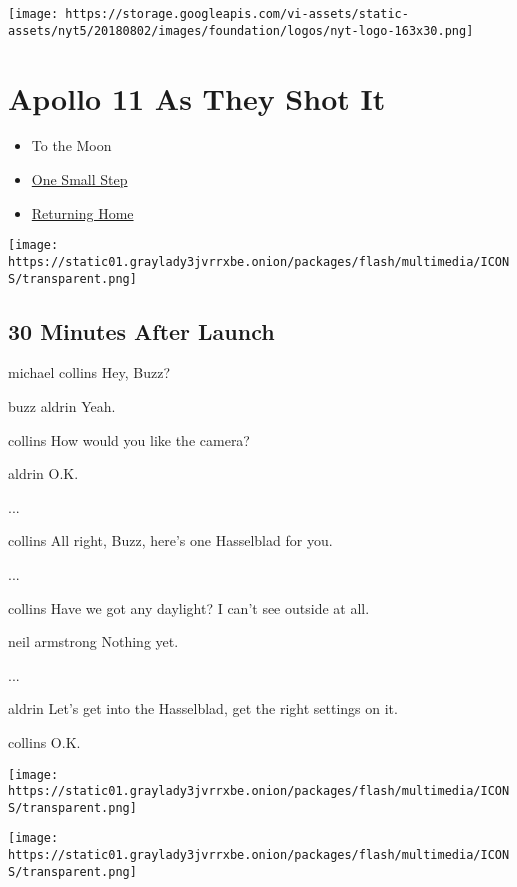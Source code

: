 \texttt{[image: https://storage.googleapis.com/vi-assets/static-assets/nyt5/20180802/images/foundation/logos/nyt-logo-163x30.png]}

\hypertarget{apollo-11-as-they-shot-it}{%
\section{\texorpdfstring{\textbf{Apollo 11} As They Shot
It}{Apollo 11 As They Shot It}}\label{apollo-11-as-they-shot-it}}

\begin{itemize}
\tightlist
\item
  To the Moon
\item
  \href{https://www.nytimes3xbfgragh.onion/interactive/2019/07/18/science/apollo-11-moon-landing-photos-ul.html}{One
  Small Step}
\item
  \href{https://www.nytimes3xbfgragh.onion/interactive/2019/07/18/science/apollo-11-moon-earth-photos-ul.html}{Returning
  Home}
\end{itemize}

\texttt{[image: https://static01.graylady3jvrrxbe.onion/packages/flash/multimedia/ICONS/transparent.png]}

\hypertarget{-30-minutes-after-launch-}{%
\subsection{ 30 Minutes After Launch }\label{-30-minutes-after-launch-}}

michael collins Hey, Buzz?

buzz aldrin Yeah.

collins How would you like the camera?

aldrin O.K.

...

collins All right, Buzz, here's one Hasselblad for you.

...

collins Have we got any daylight? I can't see outside at all.

neil armstrong Nothing yet.

...

aldrin Let's get into the Hasselblad, get the right settings on it.

collins O.K.

\texttt{[image: https://static01.graylady3jvrrxbe.onion/packages/flash/multimedia/ICONS/transparent.png]}

\texttt{[image: https://static01.graylady3jvrrxbe.onion/packages/flash/multimedia/ICONS/transparent.png]}

